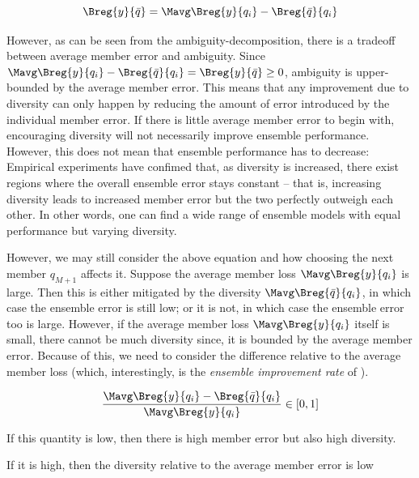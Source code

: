 \documentclass[
    a4paper, %
	fontsize=10pt, %
	twoside=false, %
]{kaobook}
\begin{document}
\begin{titlepage}
$$
\Breg{y}{\bar{q}} = \Mavg \Breg{y}{q_{i}} - \Breg{\bar{q}}{q_{i}}
$$

However, as can be seen from the ambiguity-decomposition, there is a tradeoff between average member error and ambiguity. Since 
$ \Mavg \Breg{y}{q_{i}} - \Breg{\bar{q}}{q_{i}} = \Breg{y}{\bar{q}} \geq 0$, 
ambiguity is upper-bounded by the average member error. This means that any improvement due to diversity can only happen by reducing the amount of error introduced by the individual member error. If there is little average member error to begin with, encouraging diversity will not necessarily improve ensemble performance. However, this does not mean that ensemble performance has to decrease: Empirical experiments \cite{buschj-etc} have confimed that, as diversity is increased, there exist regions where the overall ensemble error stays constant -- that is, increasing diversity leads to increased member error but the two perfectly outweigh each other. In other words, one can find a wide range of ensemble models with equal performance but varying diversity.


However, we may still consider the above equation and how choosing the next member $q_{M+1}$ affects it. Suppose the average member loss $\Mavg \Breg{y}{q_{i}}$ is large. Then this is either mitigated by the diversity $\Mavg \Breg{\bar{q}}{q_{i}}$, in which case the ensemble error is still low; or it is not, in which case the ensemble error too is large. 
However, if the average member loss $\Mavg\Breg{y}{q_i}$ itself is small, there cannot be much diversity since, it is bounded by the average member error.  Because of this, we need to consider the difference relative to the average member loss (which, interestingly, is the \textit{ensemble improvement rate} of \cite{theisen}).

$$
\frac{
\Mavg \Breg{y}{q_{i}} - \Breg{\bar{q}}{q_{i}}
}{
\Mavg \Breg{y}{q_i}
}
\in [0,1]
$$


If this quantity is low, then there is high member error but also high diversity. 

If it is high, then the diversity relative to the average member error is low 


\end{titlepage}
\end{document}
